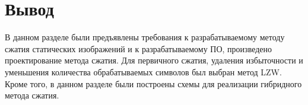 \section*{Вывод}

В данном разделе были предъявлены требования к разрабатываемому методу сжатия статических изображений и к разрабатываемому ПО, произведено проектирование метода сжатия. Для первичного сжатия, удаления избыточности и уменьшения количества обрабатываемых символов был выбран метод LZW. Кроме того, в данном разделе были построены схемы для реализации гибридного метода сжатия.
